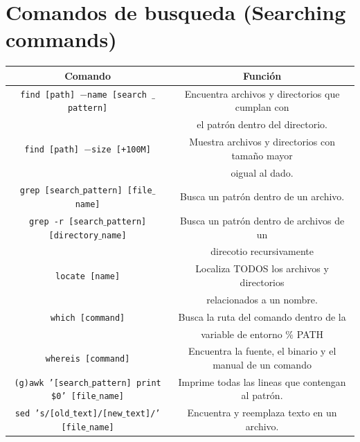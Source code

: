 \documentclass[a4paper,10pt]{article}
\begin{document}
\section*{Comandos de busqueda (Searching commands)}
\begin{center}
    \begin{tabular}{| c | c |}
        \hline
        Comando & Función \\
        \hline\hline
        \texttt{find [path] $-$name [search $\_$ pattern]} & Encuentra archivos y directorios que cumplan con\\ & el patrón dentro del directorio. \\
        \hline
        \texttt{find [path] $-$size [+100M]} & Muestra archivos y directorios con tamaño mayor \\ & oigual al dado. \\
        \hline
        \texttt{grep [search$\_$pattern] [file$\_$name]} & Busca un patrón dentro de un archivo. \\
        \hline
        \texttt{grep -r [search$\_$pattern] [directory$\_$name]} & Busca un patrón dentro de archivos de un \\ & direcotio recursivamente \\
        \hline
        \texttt{locate [name]} & Localiza TODOS los archivos y directorios \\ &  relacionados a un nombre. \\
        \hline
        \texttt{which [command]} & Busca la ruta del comando dentro de la \\ & variable de entorno $\%$ PATH \\
        \hline
        \texttt{whereis [command]} & Encuentra la fuente, el binario y el manual de un comando \\
        \hline
        \texttt{(g)awk '[search$\_$pattern] {print \$0}' [file$\_$name]} & Imprime todas las lineas que contengan al patrón. \\
        \hline
        \texttt{sed 's/[old$\_$text]/[new$\_$text]/' [file$\_$name]} & Encuentra y reemplaza texto en un archivo. \\
        \hline
    \end{tabular}
\end{center}
\end{document}
